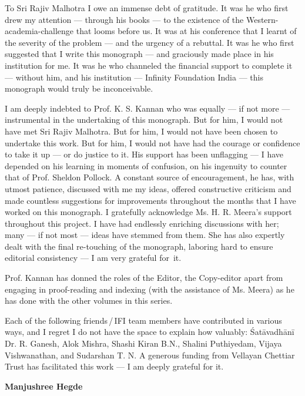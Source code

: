To Sri Rajiv Malhotra I owe an immense debt of gratitude. It was he who first drew my attention --- through his books --- to the existence of the Western-academia-challenge that looms before us. It was at his conference that I learnt of the severity of the problem --- and the urgency of a rebuttal. It was he who first suggested that I write this monograph --- and graciously made place in his institution for me. It was he who channeled the financial support to complete it --- without him, and his institution --- Infinity Foundation India --- this monograph would truly be inconceivable.   

I am deeply indebted to Prof. K. S. Kannan who was equally --- if not more --- instrumental in the undertaking of this monograph. But for him, I would not have met Sri Rajiv Malhotra. But for him, I would not have been chosen to undertake this work. But for him, I would not have had the courage or confidence to take it up --- or do justice to it. His support has been unflagging --- I have depended on his learning in moments of confusion, on his ingenuity to counter that of Prof. Sheldon Pollock. A constant source of encouragement, he has, with utmost patience, discussed with me my ideas, offered constructive criticism and made countless suggestions for improvements throughout the months that I have worked on this monograph.  I gratefully acknowledge Ms. H. R. Meera’s support throughout this project. I have had endlessly enriching discussions with her; many --- if not most --- ideas have stemmed from them.  She has also expertly dealt with the final re-touching of the monograph, laboring hard to ensure editorial consistency --- I am very grateful for~it.

Prof. Kannan has donned the roles of the Editor, the Copy-editor apart from engaging in proof-reading and indexing (with the assistance of Ms. Meera) as he has done with the other volumes in this series. 

Each of the following friends\,/\,IFI team members have contributed in various ways, and I regret I do not have the space to explain how valuably: Śatāvadhānī Dr. R. Ganesh, Alok Mishra, Shashi Kiran B.N., Shalini Puthiyedam, Vijaya Vishwanathan, and Sudarshan T. N. A generous funding from Vellayan Chettiar Trust has facilitated this work --- I am deeply grateful for it. 


\bigskip
\hfill {\bf Manjushree Hegde}

\newpage

~\phantom{a}

\vskip 50pt

